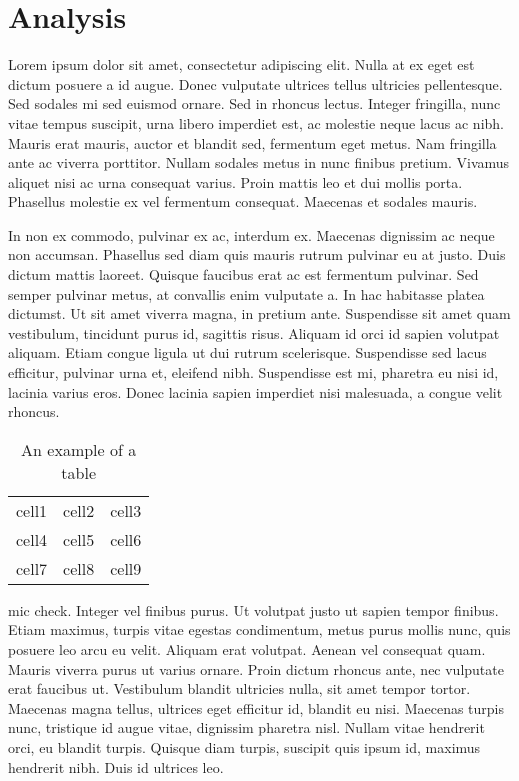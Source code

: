\chapter{Analysis}

Lorem ipsum dolor sit amet, consectetur adipiscing elit. Nulla at ex eget est dictum posuere a id augue. Donec vulputate ultrices tellus ultricies pellentesque. Sed sodales mi sed euismod ornare. Sed in rhoncus lectus. Integer fringilla, nunc vitae tempus suscipit, urna libero imperdiet est, ac molestie neque lacus ac nibh. Mauris erat mauris, auctor et blandit sed, fermentum eget metus. Nam fringilla ante ac viverra porttitor. Nullam sodales metus in nunc finibus pretium. Vivamus aliquet nisi ac urna consequat varius. Proin mattis leo et dui mollis porta. Phasellus molestie ex vel fermentum consequat. Maecenas et sodales mauris.

In non ex commodo, pulvinar ex ac, interdum ex. Maecenas dignissim ac neque non accumsan. Phasellus sed diam quis mauris rutrum pulvinar eu at justo. Duis dictum mattis laoreet. Quisque faucibus erat ac est fermentum pulvinar. Sed semper pulvinar metus, at convallis enim vulputate a. In hac habitasse platea dictumst. Ut sit amet viverra magna, in pretium ante. Suspendisse sit amet quam vestibulum, tincidunt purus id, sagittis risus. Aliquam id orci id sapien volutpat aliquam. Etiam congue ligula ut dui rutrum scelerisque. Suspendisse sed lacus efficitur, pulvinar urna et, eleifend nibh. Suspendisse est mi, pharetra eu nisi id, lacinia varius eros. Donec lacinia sapien imperdiet nisi malesuada, a congue velit rhoncus.


\begin{table}[t]
\begin{center}
\begin{tabular}{ c c c } 
 \hline
 cell1 & cell2 & cell3 \\ 
 cell4 & cell5 & cell6 \\ 
 cell7 & cell8 & cell9 \\ 
 \hline
\end{tabular}
\caption[Example Table]{An example of a table}
	\label{example_table} 
\end{center}
\end{table}

mic check. Integer vel finibus purus. Ut volutpat justo ut sapien tempor finibus. Etiam maximus, turpis vitae egestas condimentum, metus purus mollis nunc, quis posuere leo arcu eu velit. Aliquam erat volutpat. Aenean vel consequat quam. Mauris viverra purus ut varius ornare. Proin dictum rhoncus ante, nec vulputate erat faucibus ut. Vestibulum blandit ultricies nulla, sit amet tempor tortor. Maecenas magna tellus, ultrices eget efficitur id, blandit eu nisi. Maecenas turpis nunc, tristique id augue vitae, dignissim pharetra nisl. Nullam vitae hendrerit orci, eu blandit turpis. Quisque diam turpis, suscipit quis ipsum id, maximus hendrerit nibh. Duis id ultrices leo.


